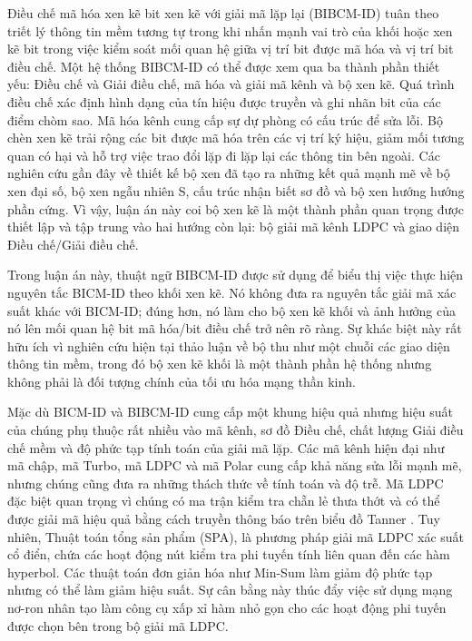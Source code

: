 Điều chế mã hóa xen kẽ bit xen kẽ với giải mã lặp lại (BIBCM-ID) tuân theo triết lý thông tin mềm tương tự trong khi nhấn mạnh vai trò của khối hoặc xen kẽ bit trong việc kiểm soát mối quan hệ giữa vị trí bit được mã hóa và vị trí bit điều chế. Một hệ thống BIBCM-ID có thể được xem qua ba thành phần thiết yếu: Điều chế và Giải điều chế, mã hóa và giải mã kênh và bộ xen kẽ. Quá trình điều chế xác định hình dạng của tín hiệu được truyền và ghi nhãn bit của các điểm chòm sao. Mã hóa kênh cung cấp sự dự phòng có cấu trúc để sửa lỗi. Bộ chèn xen kẽ trải rộng các bit được mã hóa trên các vị trí ký hiệu, giảm mối tương quan có hại và hỗ trợ việc trao đổi lặp đi lặp lại các thông tin bên ngoài. Các nghiên cứu gần đây về thiết kế bộ xen đã tạo ra những kết quả mạnh mẽ về bộ xen đại số, bộ xen ngẫu nhiên S, cấu trúc nhận biết sơ đồ và bộ xen hướng hướng phần cứng. Vì vậy, luận án này coi bộ xen kẽ là một thành phần quan trọng được thiết lập và tập trung vào hai hướng còn lại: bộ giải mã kênh LDPC và giao diện Điều chế/Giải điều chế.

Trong luận án này, thuật ngữ BIBCM-ID được sử dụng để biểu thị việc thực hiện nguyên tắc BICM-ID theo khối xen kẽ. Nó không đưa ra nguyên tắc giải mã xác suất khác với BICM-ID; đúng hơn, nó làm cho bộ xen kẽ khối và ảnh hưởng của nó lên mối quan hệ bit mã hóa/bit điều chế trở nên rõ ràng. Sự khác biệt này rất hữu ích vì nghiên cứu hiện tại thảo luận về bộ thu như một chuỗi các giao diện thông tin mềm, trong đó bộ xen kẽ khối là một thành phần hệ thống nhưng không phải là đối tượng chính của tối ưu hóa mạng thần kinh.

Mặc dù BICM-ID và BIBCM-ID cung cấp một khung hiệu quả nhưng hiệu suất của chúng phụ thuộc rất nhiều vào mã kênh, sơ đồ Điều chế, chất lượng Giải điều chế mềm và độ phức tạp tính toán của giải mã lặp. Các mã kênh hiện đại như mã chập, mã Turbo, mã LDPC và mã Polar cung cấp khả năng sửa lỗi mạnh mẽ, nhưng chúng cũng đưa ra những thách thức về tính toán và độ trễ. Mã LDPC đặc biệt quan trọng vì chúng có ma trận kiểm tra chẵn lẻ thưa thớt và có thể được giải mã hiệu quả bằng cách truyền thông báo trên biểu đồ Tanner \cite{gallager1962,mackay1996,richardson2008}. Tuy nhiên, Thuật toán tổng sản phẩm (SPA), là phương pháp giải mã LDPC xác suất cổ điển, chứa các hoạt động nút kiểm tra phi tuyến tính liên quan đến các hàm hyperbol. Các thuật toán đơn giản hóa như Min-Sum làm giảm độ phức tạp nhưng có thể làm giảm hiệu suất. Sự cân bằng này thúc đẩy việc sử dụng mạng nơ-ron nhân tạo làm công cụ xấp xỉ hàm nhỏ gọn cho các hoạt động phi tuyến được chọn bên trong bộ giải mã LDPC.

